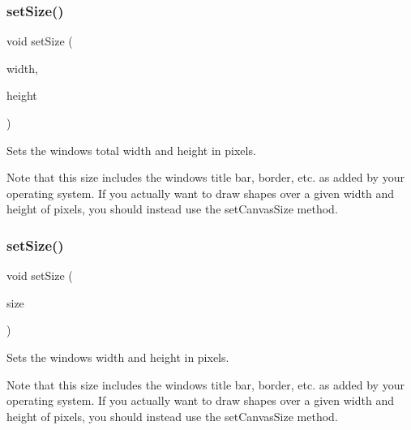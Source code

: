 \subsubsection{\texorpdfstring{set\+Size()}{setSize()}\hspace{0.1cm}{\footnotesize\ttfamily [1/2]}}
{\footnotesize\ttfamily void set\+Size (\begin{DoxyParamCaption}\item[{double}]{width,  }\item[{double}]{height }\end{DoxyParamCaption})\hspace{0.3cm}{\ttfamily [virtual]}}



Sets the window\textquotesingle{}s total width and height in pixels. 

Note that this size includes the window\textquotesingle{}s title bar, border, etc. as added by your operating system. If you actually want to draw shapes over a given width and height of pixels, you should instead use the set\+Canvas\+Size method. \mbox{\label{classsgl_1_1GWindow_ae2b628228f192c2702c4ce941b2af68f}} 
\subsubsection{\texorpdfstring{set\+Size()}{setSize()}\hspace{0.1cm}{\footnotesize\ttfamily [2/2]}}
{\footnotesize\ttfamily void set\+Size (\begin{DoxyParamCaption}\item[{const \mbox{\hyperlink{structsgl_1_1GDimension}{G\+Dimension}} \&}]{size }\end{DoxyParamCaption})\hspace{0.3cm}{\ttfamily [virtual]}}



Sets the window\textquotesingle{}s width and height in pixels. 

Note that this size includes the window\textquotesingle{}s title bar, border, etc. as added by your operating system. If you actually want to draw shapes over a given width and height of pixels, you should instead use the set\+Canvas\+Size method. \mbox{\label{classsgl_1_1GWindow_ae0d5df4c2ed47156cbba7da55362e4e1}} 
